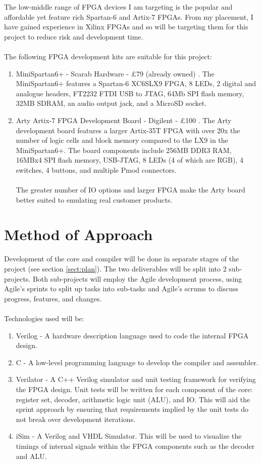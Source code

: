 \documentclass[11pt,a4paper]{article}
\begin{document}
The low-middle range of FPGA devices I am targeting is the popular and affordable yet feature rich Spartan-6 and Artix-7 FPGAs. From my placement, I have gained experience in Xilinx FPGAs and so will be targeting them for this project to reduce risk and development time.
\\\\
The following FPGA development kits are suitable for this project:
\begin{enumerate}
\item{MiniSpartan6+ - Scarab Hardware - £79 (already owned) \citep{scarabhardware}. The MiniSpartan6+ features a Spartan-6 XC6SLX9 FPGA, 8 LEDs, 2 digital and analogue headers, FT2232 FTDI USB to JTAG, 64Mb SPI flash memory, 32MB SDRAM, an audio output jack, and a MicroSD socket.}

\item{Arty Artix-7 FPGA Development Board - Digilent - £100 \citep{arty}. The Arty development board features a larger Artix-35T FPGA with over 20x the number of logic cells and block memory compared to the LX9 in the MiniSpartan6+. The board components include 256MB DDR3 RAM, 16MBx4 SPI flash memory, USB-JTAG, 8 LEDs (4 of which are RGB), 4 switches, 4 buttons, and multiple Pmod connectors.
\\\\
The greater number of IO options and larger FPGA make the Arty board better suited to emulating real customer products.
}
\end{enumerate}

\section{Method of Approach}
Development of the core and compiler will be done in separate stages of the project (see section \ref{sect:plan}). The two deliverables will be split into 2 sub-projects. Both sub-projects will employ the Agile development process, using Agile's sprints to split up tasks into sub-tasks and Agile's scrums to discuss progress, features, and changes.
\\\\
Technologies used will be:
\begin{enumerate}
\item{Verilog - A hardware description language used to code the internal FPGA design.}

\item{C - A low-level programming language to develop the compiler and assembler.}

\item{Verilator - A C++ Verilog simulator and unit testing framework for verifying the FPGA design. Unit tests will be written for each component of the core: register set, decoder, arithmetic logic unit (ALU), and IO. This will aid the sprint approach by ensuring that requirements implied by the unit tests do not break over development iterations.}

\item{iSim - A Verilog and VHDL Simulator. This will be used to visualize the timings of internal signals within the FPGA components such as the decoder and ALU.}
\end{enumerate}
\end{document}
